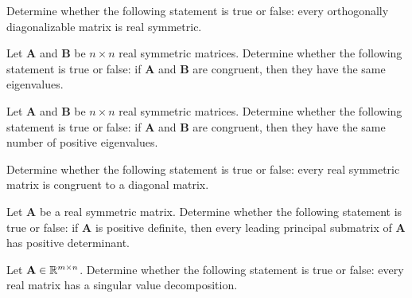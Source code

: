 \begin{problem}
Determine whether the following statement is true or false: every orthogonally diagonalizable matrix is real symmetric.
\end{problem}

\begin{problem}
Let $\mathbf A$ and $\mathbf B$ be $n\times n$ real symmetric matrices. Determine whether the following statement is true or false: if $\mathbf A$ and $\mathbf B$ are congruent, then they have the same eigenvalues.
\end{problem}

\begin{problem}
Let $\mathbf A$ and $\mathbf B$ be $n\times n$ real symmetric matrices. Determine whether the following statement is true or false: if $\mathbf A$ and $\mathbf B$ are congruent, then they have the same number of positive eigenvalues.
\end{problem}

\begin{problem}
Determine whether the following statement is true or false: every real symmetric matrix is congruent to a diagonal matrix.
\end{problem}

\begin{problem}
Let $\mathbf A$ be a real symmetric matrix. Determine whether the following statement is true or false: if $\mathbf A$ is positive definite, then every leading principal submatrix of $\mathbf A$ has positive determinant.
\end{problem}

\begin{problem}
Let $\mathbf A\in\mathbb{R}^{m\times n}$. Determine whether the following statement is true or false: every real matrix has a singular value decomposition.
\end{problem}


